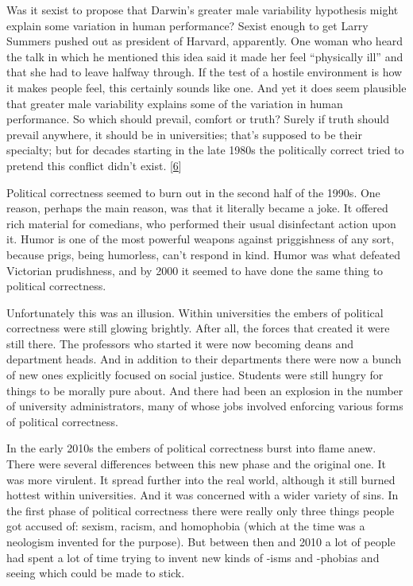 Was it sexist to propose that Darwin's greater male variability
hypothesis might explain some variation in human performance? Sexist
enough to get Larry Summers pushed out as president of Harvard,
apparently. One woman who heard the talk in which he mentioned this idea
said it made her feel ``physically ill'' and that she had to leave
halfway through. If the test of a hostile environment is how it makes
people feel, this certainly sounds like one. And yet it does seem
plausible that greater male variability explains some of the variation
in human performance. So which should prevail, comfort or truth? Surely
if truth should prevail anywhere, it should be in universities; that's
supposed to be their specialty; but for decades starting in the late
1980s the politically correct tried to pretend this conflict didn't
exist. {[}\hyperref[f6n]{6}{]}

Political correctness seemed to burn out in the second half of the
1990s. One reason, perhaps the main reason, was that it literally became
a joke. It offered rich material for comedians, who performed their
usual disinfectant action upon it. Humor is one of the most powerful
weapons against priggishness of any sort, because prigs, being
humorless, can't respond in kind. Humor was what defeated Victorian
prudishness, and by 2000 it seemed to have done the same thing to
political correctness.

Unfortunately this was an illusion. Within universities the embers of
political correctness were still glowing brightly. After all, the forces
that created it were still there. The professors who started it were now
becoming deans and department heads. And in addition to their
departments there were now a bunch of new ones explicitly focused on
social justice. Students were still hungry for things to be morally pure
about. And there had been an explosion in the number of university
administrators, many of whose jobs involved enforcing various forms of
political correctness.

In the early 2010s the embers of political correctness burst into flame
anew. There were several differences between this new phase and the
original one. It was more virulent. It spread further into the real
world, although it still burned hottest within universities. And it was
concerned with a wider variety of sins. In the first phase of political
correctness there were really only three things people got accused of:
sexism, racism, and homophobia (which at the time was a neologism
invented for the purpose). But between then and 2010 a lot of people had
spent a lot of time trying to invent new kinds of -isms and -phobias and
seeing which could be made to stick.

